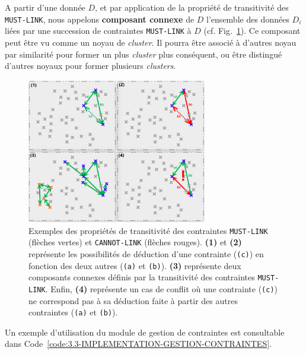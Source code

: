 		A partir d'une donnée \(D\), et par application de la propriété de transitivité des \texttt{MUST-LINK}, nous appelons \textbf{composant connexe} de \(D\) l'ensemble des données \(D_i\) liées par une succession de contraintes \texttt{MUST-LINK} à \(D\) (cf. Fig.~\ref{figure:3.3-CONTRAINTES-TRANSITIVITE}).
		Ce composant peut être vu comme un noyau de \textit{cluster}. Il pourra être associé à d'autres noyau par similarité pour former un plus \textit{cluster} plus conséquent, ou être distingué d'autres noyaux pour former plusieurs \textit{clusters}.

		\begin{figure}[!htb]
			\centering
			\includegraphics[width=0.7\textwidth]{figures/example-constraints-transitivity}
			\caption{Exemples des propriétés de transitivité des contraintes \texttt{MUST-LINK} (flèches vertes) et \texttt{CANNOT-LINK} (flèches rouges). \textbf{(1)} et \textbf{(2)} représente les possibilités de déduction d'une contrainte (\texttt{(c)}) en fonction des deux autres (\texttt{(a)} et \texttt{(b)}). \textbf{(3)} représente deux composants connexes définis par la transitivité des contraintes \texttt{MUST-LINK}. Enfin, \textbf{(4)} représente un cas de conflit où une contrainte (\texttt{(c)}) ne correspond pas à sa déduction faite à partir des autres contraintes (\texttt{(a)} et \texttt{(b)}).}
			\label{figure:3.3-CONTRAINTES-TRANSITIVITE}
		\end{figure}
		
		Un exemple d'utilisation du module de gestion de contraintes est consultable dans Code~\ref{code:3.3-IMPLEMENTATION-GESTION-CONTRAINTES}.
		
